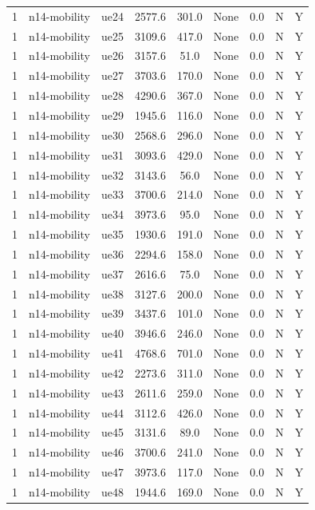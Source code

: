 \begin{table}[ht]
\begin{tabular}{|c|c|c|c|c|c|c|c|c|}
1 & n14-mobility & ue24 & 2577.6 & 301.0 & None & 0.0 & N & Y \\
1 & n14-mobility & ue25 & 3109.6 & 417.0 & None & 0.0 & N & Y \\
1 & n14-mobility & ue26 & 3157.6 & 51.0 & None & 0.0 & N & Y \\
1 & n14-mobility & ue27 & 3703.6 & 170.0 & None & 0.0 & N & Y \\
1 & n14-mobility & ue28 & 4290.6 & 367.0 & None & 0.0 & N & Y \\
1 & n14-mobility & ue29 & 1945.6 & 116.0 & None & 0.0 & N & Y \\
1 & n14-mobility & ue30 & 2568.6 & 296.0 & None & 0.0 & N & Y \\
1 & n14-mobility & ue31 & 3093.6 & 429.0 & None & 0.0 & N & Y \\
1 & n14-mobility & ue32 & 3143.6 & 56.0 & None & 0.0 & N & Y \\
1 & n14-mobility & ue33 & 3700.6 & 214.0 & None & 0.0 & N & Y \\
1 & n14-mobility & ue34 & 3973.6 & 95.0 & None & 0.0 & N & Y \\
1 & n14-mobility & ue35 & 1930.6 & 191.0 & None & 0.0 & N & Y \\
1 & n14-mobility & ue36 & 2294.6 & 158.0 & None & 0.0 & N & Y \\
1 & n14-mobility & ue37 & 2616.6 & 75.0 & None & 0.0 & N & Y \\
1 & n14-mobility & ue38 & 3127.6 & 200.0 & None & 0.0 & N & Y \\
1 & n14-mobility & ue39 & 3437.6 & 101.0 & None & 0.0 & N & Y \\
1 & n14-mobility & ue40 & 3946.6 & 246.0 & None & 0.0 & N & Y \\
1 & n14-mobility & ue41 & 4768.6 & 701.0 & None & 0.0 & N & Y \\
1 & n14-mobility & ue42 & 2273.6 & 311.0 & None & 0.0 & N & Y \\
1 & n14-mobility & ue43 & 2611.6 & 259.0 & None & 0.0 & N & Y \\
1 & n14-mobility & ue44 & 3112.6 & 426.0 & None & 0.0 & N & Y \\
1 & n14-mobility & ue45 & 3131.6 & 89.0 & None & 0.0 & N & Y \\
1 & n14-mobility & ue46 & 3700.6 & 241.0 & None & 0.0 & N & Y \\
1 & n14-mobility & ue47 & 3973.6 & 117.0 & None & 0.0 & N & Y \\
1 & n14-mobility & ue48 & 1944.6 & 169.0 & None & 0.0 & N & Y \\

\end{tabular}
\end{table}
